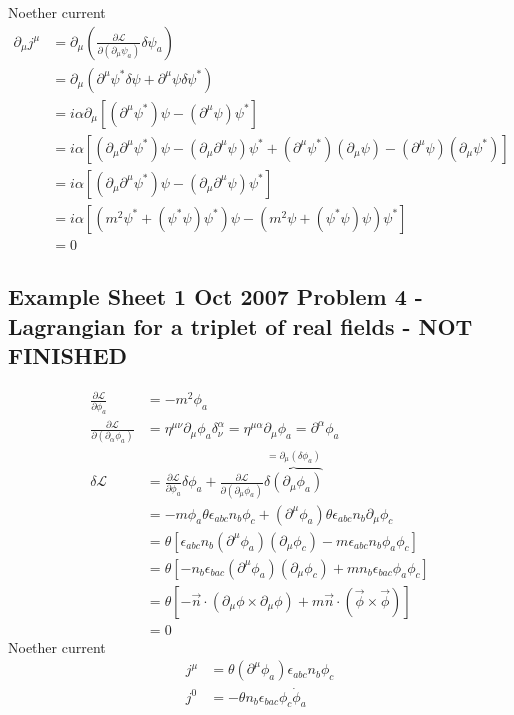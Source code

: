 \documentclass[../main.tex]{subfiles}
\begin{document}
Noether current 
\begin{align}
\partial_\mu j^\mu&=\partial_\mu\left(\frac{\partial\mathcal{L}}{\partial(\partial_\mu\psi_a)}\delta\psi_a\right)\\
&=\partial_\mu\left(\partial^\mu\psi^*\delta\psi+\partial^\mu\psi\delta\psi^*\right)\\
&=i\alpha\partial_\mu\left[(\partial^\mu\psi^*)\psi-(\partial^\mu\psi)\psi^*\right]\\
&=i\alpha\left[(\partial_\mu\partial^\mu\psi^*)\psi-(\partial_\mu\partial^\mu\psi)\psi^*+(\partial^\mu\psi^*)(\partial_\mu\psi)-(\partial^\mu\psi)(\partial_\mu\psi^*)\right]\\
&=i\alpha\left[(\partial_\mu\partial^\mu\psi^*)\psi-(\partial_\mu\partial^\mu\psi)\psi^*\right]\\
&=i\alpha\left[(m^2\psi^*+(\psi^*\psi)\psi^*)\psi-(m^2\psi+(\psi^*\psi)\psi)\psi^*\right]\\
&=0
\end{align}

\subsection{Example Sheet 1 Oct 2007 Problem 4 - Lagrangian for a triplet of real fields - NOT FINISHED}
\begin{align}
\frac{\partial \mathcal{L}}{\partial\phi_a}
&=-m^2\phi_a\\
\frac{\partial \mathcal{L}}{\partial(\partial_\alpha\phi_a)}
&=\eta^{\mu\nu}\partial_\mu\phi_a\delta^\alpha_\nu
=\eta^{\mu\alpha}\partial_\mu\phi_a
=\partial^\alpha\phi_a\\
\delta\mathcal{L}
&=\frac{\partial\mathcal{L}}{\partial\phi_a}\delta\phi_a+\frac{\partial\mathcal{L}}{\partial(\partial_\mu\phi_a)}\overbrace{\delta(\partial_\mu\phi_a)}^{=\partial_\mu(\delta\phi_a)}\\
&=-m\phi_a\theta\epsilon_{abc}n_b\phi_c+(\partial^\mu\phi_a)\theta\epsilon_{abc}n_b\partial_\mu\phi_c\\
&=\theta[\epsilon_{abc}n_b(\partial^\mu\phi_a)(\partial_\mu\phi_c)-m\epsilon_{abc}n_b\phi_a\phi_c]\\
&=\theta[-n_b\epsilon_{bac}(\partial^\mu\phi_a)(\partial_\mu\phi_c)+m n_b\epsilon_{bac}\phi_a\phi_c]\\
&=\theta[-\vec{n}\cdot(\partial_\mu\phi\times\partial_\mu\phi)+m\vec{n}\cdot(\vec{\phi}\times\vec{\phi})]\\
&=0
\end{align}
Noether current
\begin{align}
j^\mu&=\theta(\partial^\mu\phi_a)\epsilon_{abc}n_b\phi_c\\
j^0&=-\theta n_b\epsilon_{bac}\phi_c\dot{\phi}_a
\end{align}
\end{document}
